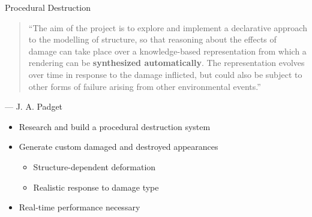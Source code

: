 \documentclass[t]{beamer}
\begin{document}
		\begin{frame}[noframenumbering]{Procedural Destruction}
		\begin{quote} \footnotesize
		``The aim of the project is to explore and implement a declarative approach to the modelling of structure, so that reasoning about the effects of damage can take place over a knowledge-based representation from which a rendering can be \textbf{synthesized automatically}.  The representation evolves over time in response to the damage inflicted, but could also be subject to other forms of failure arising from other environmental events.''\end{quote}
		\hfill --- J. A. Padget
		\begin{itemize}
			\item Research and build a procedural destruction system
			\item Generate custom damaged and destroyed appearances
				\begin{itemize}
					\item Structure-dependent deformation
					\item Realistic response to damage type
				\end{itemize}
			\item Real-time performance necessary
		\end{itemize}
		\end{frame}
\end{document}

